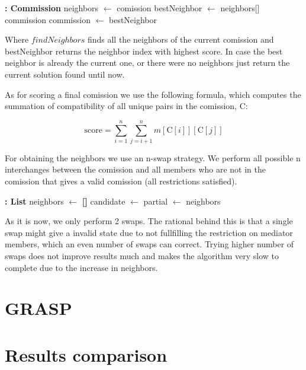 \documentclass{article}
\begin{document}
\begin{algorithm}
\begin{algorithmic}[H]
 \textbf{: Commission}
        \State neighbors $\gets$ 
          \State \Return comission
        \EndIf
        \State bestNeighbor $\gets$ neighbors[]
            \State \Return commission
        \EndIf
        \State commission $\gets$ bestNeighbor
    \EndWhile
\EndFunction
\end{algorithmic}
\end{algorithm}

Where $findNeighbors$ finds all the neighbors of the current comission and bestNeighbor returns the neighbor index with highest score. In case the best neighbor is already the current one, or there were no neighbors just return the current solution found until now.

As for scoring a final comission we use the following formula, which computes the summation of compatibility of all unique pairs in the comission, C:

\[
\text{score} = \sum_{i=1}^{n} \sum_{j=i+1}^{n} m[\text{C}[i]][\text{C}[j]]
\]

For obtaining the neighbors we use an n-swap strategy. We perform all possible n interchanges between the comission and all members who are not in the comission that gives a valid comission (all restrictions satisfied).

\begin{algorithm}
\begin{algorithmic}[H]
 \textbf{: List}
    \State neighbors $\gets$ \textbf{[]}
            \State candidate $\gets$ 
                \State {}
                \State partial $\gets$ 
                \State {}
            \EndIf
        \EndFor
    \EndFor
    \State \Return neighbors
\EndFunction
\end{algorithmic}
\end{algorithm}

As it is now, we only perform 2 swaps. The rational behind this is that a single swap might give a invalid state due to not fullfilling the restriction on mediator members, which an even number of swaps can correct. Trying higher number of swaps does not improve results much and makes the algorithm very slow to complete due to the increase in neighbors.

\section{GRASP}
\section{Results comparison}
\end{document}
